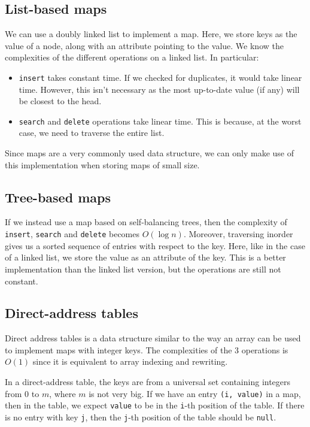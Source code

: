 \documentclass[a4paper, openany]{memoir}
\begin{document}
\subsection{List-based maps}
We can use a doubly linked list to implement a map. Here, we store keys as the value of a node, along with an attribute pointing to the value. We know the complexities of the different operations on a linked list. In particular:
\begin{itemize}
    \item \texttt{insert} takes constant time. If we checked for duplicates, it would take linear time. However, this isn't necessary as the most up-to-date value (if any) will be closest to the head.
    \item \texttt{search} and \texttt{delete} operations take linear time. This is because, at the worst case, we need to traverse the entire list.
\end{itemize}
Since maps are a very commonly used data structure, we can only make use of this implementation when storing maps of small size.

\subsection{Tree-based maps}
If we instead use a map based on self-balancing trees, then the complexity of \texttt{insert}, \texttt{search} and \texttt{delete} becomes $O(\log n)$. Moreover, traversing inorder gives us a sorted sequence of entries with respect to the key. Here, like in the case of a linked list, we store the value as an attribute of the key. This is a better implementation than the linked list version, but the operations are still not constant.

\subsection{Direct-address tables}
Direct address tables is a data structure similar to the way an array can be used to implement maps with integer keys. The complexities of the 3 operations is $O(1)$ since it is equivalent to array indexing and rewriting. 

\noindent In a direct-address table, the keys are from a universal set containing integers from 0 to $m$, where $m$ is not very big. If we have an entry \texttt{(i, value)} in a map, then in the table, we expect \texttt{value} to be in the \texttt{i}-th position of the table. If there is no entry with key \texttt{j}, then the \texttt{j}-th position of the table should be \texttt{null}. 
\end{document}
